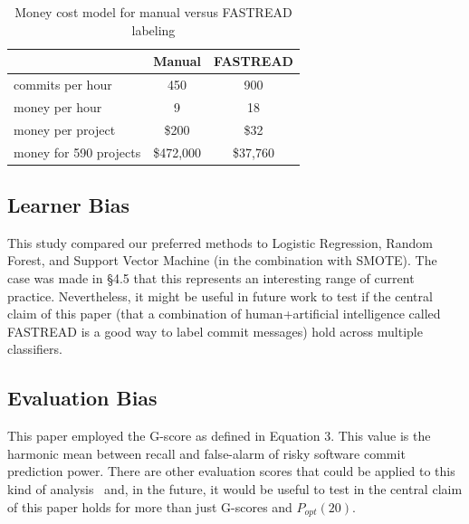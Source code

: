 \documentclass[10pt,journal,compsoc]{IEEEtran}
\begin{document}
\begin{table}[!t]
\caption{Money cost model for manual versus FASTREAD labeling}
\label{tbl:time2}
\vspace{-10pt}
\begin{center}

\begin{tabular}{ l|c|c }
 \multicolumn{1}{c|}{} & \multicolumn{1}{c|}{Manual} & \multicolumn{1}{c}{FASTREAD}\\
\hline
commits per hour & 450 & 900 \\
money per hour & 9 & 18 \\
money per project & \$200 & \$32 \\
money for 590 projects & \$472,000 & \$37,760 \\ 
\end{tabular}
\end{center}
\vspace{2mm}
\end{table}
\subsection{Learner Bias}

This study compared our preferred methods to
 Logistic Regression, Random Forest, and Support Vector Machine (in the combination with SMOTE). 
 The case was made in \S 4.5 that this represents an interesting range of current practice.
 Nevertheless, it might be useful in future work to test if the central
claim of this paper (that a combination of human+artificial intelligence called FASTREAD is a good way to label commit messages)
hold across multiple classifiers.


\subsection{Evaluation Bias}

This paper employed  the G-score as defined in Equation 3.
This value is the harmonic mean between recall and false-alarm of risky software commit prediction power. There are other evaluation scores that could be applied to this kind of analysis~\cite{lo17_ifa}
and, in the future, it would be useful to test in the central claim of this paper holds for more than just G-scores and $P_{opt}(20)$.
\end{document}
